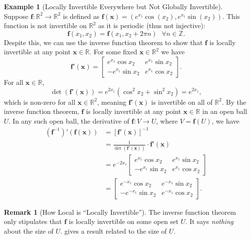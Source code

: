 \documentclass{article}
\newcommand{\R}{\mathbb{R}}
\newcommand{\x}{\mathbf{x}}
\newcommand{\f}{\mathbf{f}}
\newcommand{\Z}{\mathbb{Z}}
\theoremstyle{definition}
\newtheorem{example}{Example}[section]
\newtheorem{remark}{Remark}[section]
\begin{document}
	\begin{example}[Locally Invertible Everywhere but Not Globally Invertible]
		Suppose $ \f:\R^2\to\R^2 $ is defined as $ \f(\x)=(e^{x_1}\cos(x_2),e^{x_1}\sin(x_2)) $. This function is not invertible on $ \R^2 $ as it is periodic (thus not injective):
		$$ \f(x_1,x_2) = \f(x_1, x_2+2\pi n)\ \ \ \forall n\in \Z.$$ Despite this, we can use the inverse function theorem to show that $ \f $ is locally invertible at any point $ \x\in \R $. For some fixed $ \x\in \R^2 $ we have $$ \f'(\x)=\begin{bmatrix}
			e^{x_1}\cos x_2 & e^{x_1}\sin x_2 \\
			-e^{x_1}\sin x_2 & e^{x_1}\cos x_2
		\end{bmatrix}. $$ For all $ \x\in\R $, $$ \det(\f'(\x)) = e^{2x_1}(\cos^2x_2 + \sin^2x_2)= e^{2x_1} ,$$ which is non-zero for all $ \x\in \R^2 $, meaning $ \f'(\x) $ is invertible on all of $ \R^2 $. By the inverse function theorem, $ \f $ is locally invertible at any point $ \x\in \R $ in an open ball $ U $. In any such open ball, the derivative of $ \f:V\to U $, where $ V=\f(U) $, we have 
		\begin{align*}
			(\f^{-1})'(\f(\x)) &= [\f'(\x)]^{-1}\\
			& =\frac{1}{\det(\f'(\x))}\cdot \f'(\x)\\
			& = e^{-2x_1}\begin{bmatrix}
				e^{x_1}\cos x_2 & e^{x_1}\sin x_2 \\
				-e^{x_1}\sin x_2 & e^{x_1}\cos x_2
			\end{bmatrix}\\
			& = \begin{bmatrix}
				e^{-x_1}\cos x_2 & e^{-x_1}\sin x_2 \\
				-e^{-x_1}\sin x_2 & e^{-x_1}\cos x_2
			\end{bmatrix}.
		\end{align*}
	\end{example}
	\begin{remark}[How Local is ``Locally Invertible'']
		The inverse function theorem only stipulates that $ \f $ is locally invertible on some open set $ U $. It says \textit{nothing} about the size of $ U $. \cite{lang2012real} gives a result related to the size of $ U $.  
	\end{remark}
\end{document}
